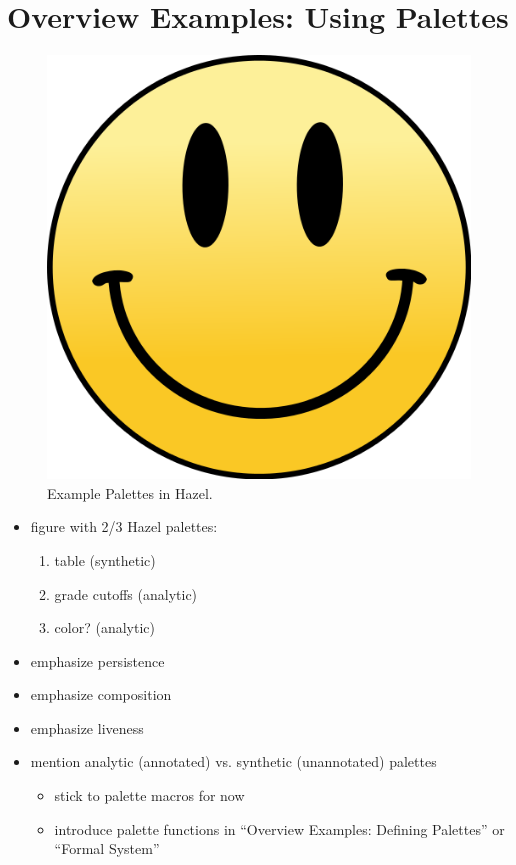 \section{Overview Examples: Using Palettes}
\label{sec:overview}

\begin{figure}

\includegraphics[scale=0.50]{images/MrSmileyFace.png}

\caption{Example Palettes in Hazel.}
\end{figure}

\begin{itemize}

\item figure with 2/3 Hazel palettes:

  \begin{enumerate}
    \item table (synthetic)
    \item grade cutoffs (analytic)
    \item color? (analytic)
  \end{enumerate}

\item emphasize persistence

\item emphasize composition

\item emphasize liveness

\item mention analytic (annotated) vs. synthetic (unannotated) palettes

  \begin{itemize}
    \item stick to palette macros for now
    \item introduce palette functions in ``Overview Examples: Defining Palettes''
          or ``Formal System''
  \end{itemize}

\end{itemize}
